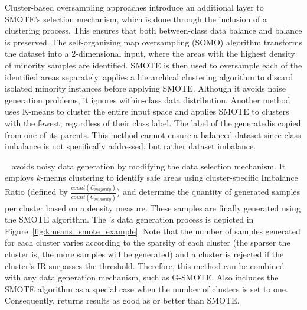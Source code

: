 \documentclass[remotesensing,article,submit,moreauthors,pdftex]{Definitions/mdpi}
\begin{document}
\begin{paracol}{2}
Cluster-based oversampling approaches introduce an additional layer to SMOTE's
selection mechanism, which is done through the inclusion of a clustering
process. This ensures that both between-class data balance and
 balance is preserved. The
self-organizing map oversampling (SOMO) \cite{Douzas2017} algorithm transforms
the dataset into a 2-dimensional input, where the areas with the highest
density of minority samples are identified.  SMOTE is then used to oversample
each of the identified areas separately.   \cite{Ma2017} applies a hierarchical clustering
algorithm to discard isolated minority instances before applying SMOTE.
Although it avoids noise generation problems, it ignores within-class data
distribution. Another method \cite{Santos2015} uses K-means to cluster the
entire input space and applies SMOTE to clusters with the fewest, regardless of their class label. The label of the
generatedis copied from one of its parents.
This method cannot ensure a balanced dataset since class imbalance is not
specifically addressed, but rather dataset imbalance.

~\cite{Douzas2018} avoids noisy data
generation by modifying the data selection mechanism. It employs $k$-means
clustering to identify safe areas using cluster-specific Imbalance Ratio
(defined by $\frac{count(C_{majority})}{count(C_{minority})}$) and
determine the quantity of generated samples per cluster based on a density
measure. These samples are finally generated using the SMOTE algorithm. The
's data generation process is depicted in
Figure~\ref{fig:kmeans_smote_example}. Note that the number of samples
generated for each cluster varies according to the sparsity of each cluster
(the sparser the cluster is, the more samples will be generated) and a cluster
is rejected if the cluster's IR surpasses the threshold.  Therefore, this
method can be combined with any data generation mechanism, such as G-SMOTE.
Also  includes the SMOTE algorithm as a
special case when the number of clusters is set to one. Consequently,
  returns
results as good as or better than SMOTE.

\end{paracol}
\end{document}
